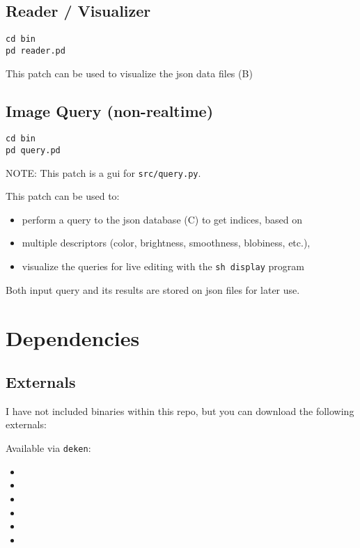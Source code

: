 \subsection{Reader / Visualizer}

\begin{verbatim}
cd bin
pd reader.pd
\end{verbatim}

This patch can be used to visualize the \gls{json} data files (B)




\subsection{Image Query (non-realtime)}

\begin{verbatim}
cd bin
pd query.pd
\end{verbatim}

NOTE: This patch is a gui for \texttt{src/query.py}.

This patch can be used to:

\begin{itemize}
  \singlespacing
\tightlist
\item
  perform a query to the \gls{json} database (C) to get indices, based on
\item
  multiple descriptors (color, brightness, smoothness, blobiness, etc.),
\item
  visualize the queries for live editing with the \texttt{sh\ display} program
\end{itemize}

Both input query and its results are stored on \gls{json} files for later use.




\section{Dependencies}


\subsection{Externals}

I have not included binaries within this repo, but you can download the following externals:

Available via \texttt{deken}:

\begin{itemize}
  \singlespacing
\tightlist
\item
\item
\item
\item
\item
\item
\end{itemize}

